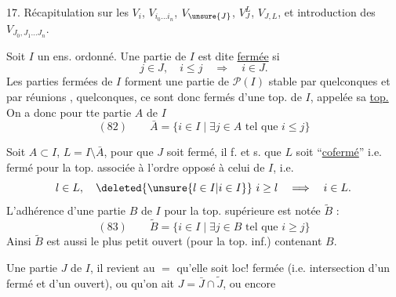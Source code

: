 
17. Récapitulation sur les $V_i$, $V_{i_0\ldots i_n}$, $V_{\unsure{J}}$, $V_J^L$, $V_{J,L}$, et introduction des $V_{J_0,J_1\ldots J_n}$.

Soit $I$ un ens. ordonné. Une partie  de $I$ est dite \uline{fermée} si
\[j\in J,\quad i\leq j\quad\Longrightarrow\quad i\in J.\]
Les parties fermées de $I$ forment une  partie de $\mathcal P(I)$ stable par  quelconques et par réunions , quelconques, ce sont donc   fermés d'une top. de $I$, appelée sa \uline{top.}   On a donc pour tte partie $A$ de $I$
\[
(82)\qquad\bar A=\{i\in I\mid\exists j\in A\text{ tel que }i\leq j\}
\]

 Soit $A\subset I$, $L=I\setminus\bar A$, pour que $J$ soit fermé,  il f. et s. que $L$ soit ``\uline{cofermé}'' i.e. fermé pour la top. associée à l'ordre opposé à  celui de $I$, i.e.
\[l\in L,\quad\deleted{\unsure{l\in I|i\in I}}\ i\geq l\quad\Longrightarrow\quad i\in L.\]
L'adhérence d'une partie $B$ de $I$ pour la top. supérieure est notée $\widetilde B$ :
\[
(83)\qquad\widetilde B=\{i\in I\mid\exists j\in B\text{ tel que }i\geq j\}
\]
 Ainsi $\widetilde B$ est aussi le plus petit ouvert (pour la top. inf.) contenant $B$.

 Une partie $J$ de $I$, il revient au $=$ qu'elle soit loc! fermée (i.e. intersection d'un fermé et d'un ouvert), ou qu'on ait $J=\bar J\cap\widetilde J$, ou encore

